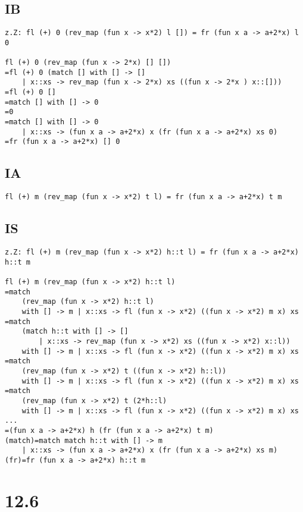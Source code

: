 \documentclass{article}
\begin{document}
\subsection*{IB}

\begin{lstlisting}
z.Z: fl (+) 0 (rev_map (fun x -> x*2) l []) = fr (fun x a -> a+2*x) l 0

fl (+) 0 (rev_map (fun x -> 2*x) [] [])
=fl (+) 0 (match [] with [] -> []
	| x::xs -> rev_map (fun x -> 2*x) xs ((fun x -> 2*x ) x::[]))
=fl (+) 0 []
=match [] with [] -> 0
=0
=match [] with [] -> 0
	| x::xs -> (fun x a -> a+2*x) x (fr (fun x a -> a+2*x) xs 0)
=fr (fun x a -> a+2*x) [] 0
\end{lstlisting}

\subsection*{IA}

\begin{lstlisting}
fl (+) m (rev_map (fun x -> x*2) t l) = fr (fun x a -> a+2*x) t m
\end{lstlisting}

\subsection*{IS}

\begin{lstlisting}
z.Z: fl (+) m (rev_map (fun x -> x*2) h::t l) = fr (fun x a -> a+2*x) h::t m

fl (+) m (rev_map (fun x -> x*2) h::t l)
=match
	(rev_map (fun x -> x*2) h::t l)
	with [] -> m | x::xs -> fl (fun x -> x*2) ((fun x -> x*2) m x) xs
=match
	(match h::t with [] -> []
		| x::xs -> rev_map (fun x -> x*2) xs ((fun x -> x*2) x::l))
	with [] -> m | x::xs -> fl (fun x -> x*2) ((fun x -> x*2) m x) xs
=match
	(rev_map (fun x -> x*2) t ((fun x -> x*2) h::l))
	with [] -> m | x::xs -> fl (fun x -> x*2) ((fun x -> x*2) m x) xs
=match
	(rev_map (fun x -> x*2) t (2*h::l)
	with [] -> m | x::xs -> fl (fun x -> x*2) ((fun x -> x*2) m x) xs
...
=(fun x a -> a+2*x) h (fr (fun x a -> a+2*x) t m)
(match)=match match h::t with [] -> m
	| x::xs -> (fun x a -> a+2*x) x (fr (fun x a -> a+2*x) xs m)
(fr)=fr (fun x a -> a+2*x) h::t m
\end{lstlisting}

\section*{12.6}
\end{document}
